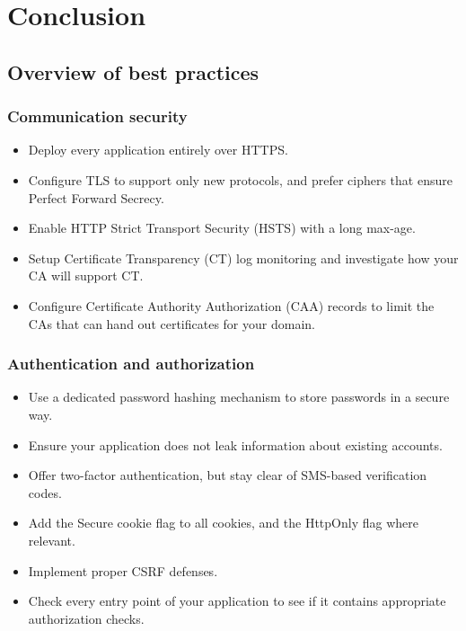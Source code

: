 \documentclass[../main.tex]{subfiles}
\begin{document}
\chapter{Conclusion}

\section{Overview of best practices}
\subsection{Communication security}
\begin{itemize}
\item Deploy every application entirely over HTTPS.
\item Configure TLS to support only new protocols, and prefer ciphers that ensure Perfect Forward Secrecy.
\item Enable HTTP Strict Transport Security (HSTS) with a long max-age. 
\item Setup Certificate Transparency (CT) log monitoring and investigate how your CA will support CT.
\item Configure Certificate Authority Authorization (CAA) records to limit the CAs that can hand out certificates for your domain.
\end{itemize}

\subsection{Authentication and authorization}
\begin{itemize}
\item Use a dedicated password hashing mechanism to store passwords in a secure way.
\item Ensure your application does not leak information about existing accounts.
\item Offer two-factor authentication, but stay clear of SMS-based verification codes.
\item Add the Secure cookie flag to all cookies, and the HttpOnly flag where relevant.
\item Implement proper CSRF defenses.
\item Check every entry point of your application to see if it contains appropriate authorization checks.
\end{itemize}
\end{document}
